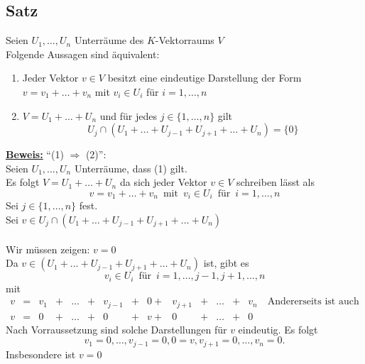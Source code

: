 \subsection{Satz} %
\label{sub:satz}
Seien $U_1, \ldots , U_n$ Unterräume des $K$-Vektorraums $V$ \\
Folgende Aussagen sind äquivalent:
\begin{enumerate}[(1)]
	\item Jeder Vektor $v \in V$ besitzt eine eindeutige Darstellung der Form 
	$v= v_1 + \ldots + v_n$ mit $v_i \in U_i$ für $i=1, \ldots , n$
	\item $V= U_1 + \ldots  + U_n$ und für jedes $j \in \{1, \ldots , n\}$ gilt 
	\[
		U_j \cap (U_1 + \ldots  + U_{j-1} +U_{j+1}+ \ldots + U_n) = \{ 0\}
	\]
\end{enumerate}
\underline{\textbf{Beweis:}} ``(1) $\Rightarrow$ (2)'': \\
Seien $U_1, \ldots , U_n$ Unterräume, dass (1) gilt. \\
Es folgt $V= U_1 + \ldots + U_n$ da sich jeder Vektor $v \in V$ schreiben lässt als
\[
	v= v_1 + \ldots + v_n \enspace \text{mit} \enspace v_i \in U_i \enspace \text{für} \enspace i=1, \ldots , n
\]
Sei $j \in \{ 1, \ldots , n\}$ fest. \\
Sei $v \in U_j \cap (U_1 + \ldots  + U_{j-1} +U_{j+1}+ \ldots + U_n)$ \\
\vspace{\baselineskip} \\
Wir müssen zeigen: $v=0$ \\
Da $v \in  (U_1 + \ldots  + U_{j-1} +U_{j+1}+ \ldots + U_n)$ ist, gibt es 
\[
	v_i \in U_i \enspace \text{für} \enspace i=1, \ldots , j-1, j+1, \ldots , n
\] mit
\[
	\begin{array}{cccccccccccccl}
		v &= &v_1 &+ &\ldots &+ &v_{j-1} &+ &0 + &v_{j+1} &+ &\ldots &+ &v_n  \quad \text{Andererseits ist auch} \\
		v &= &0 &+ &\ldots &+ &0 &+ &v + &0 &+ &\ldots &+ &0 
	\end{array}
\]
Nach Vorraussetzung sind solche Darstellungen für $v$ eindeutig. Es folgt
\[
	v_1 = 0, \ldots , v_{j-1}=0 , 0=v , v_{j+1}=0, \ldots , v_n =0.
\]
Insbesondere ist $v=0$ \\

